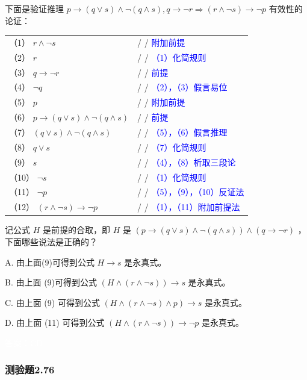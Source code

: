 \documentclass[UTF8, heading=true]{ctexart}
\begin{document}
下面是验证推理 $p \rightarrow(q \vee s) \wedge \neg(q \wedge s), q \rightarrow \neg r \Longrightarrow(r \wedge \neg s) \rightarrow \neg p$ 有效性的论证：
\begin{table}[H]
  \centering
  \renewcommand{\arraystretch}{1.5}
  \begin{tabular}{ll}
    （1）  $r \wedge \neg s$ & / / \textcolor{blue}{附加前提} \\
    （2）  $r$ & / / \textcolor{blue}{（1）化简规则} \\
    （3）  $q \rightarrow \neg r$ & / / \textcolor{blue}{前提} \\
    （4）  $\neg q$ & / / \textcolor{blue}{（2），（3）假言易位} \\
    （5）  $p$ & / / \textcolor{blue}{附加前提} \\
    （6）  $p \rightarrow(q \vee s) \wedge \neg(q \wedge s)$ & / / \textcolor{blue}{前提} \\
    （7）  $(q \vee s) \wedge \neg(q \wedge s)$ & / / \textcolor{blue}{（5），（6）假言推理} \\
    （8）  $q \vee s$ & / / \textcolor{blue}{（7）化简规则} \\
    （9）  $s$ & / / \textcolor{blue}{（4），（8）析取三段论} \\
    （10）  $\neg s$ & / / \textcolor{blue}{（1）化简规则} \\
    （11）  $\neg p$ & / / \textcolor{blue}{（5），（9），（10）反证法} \\
    （12）  $(r \wedge \neg s) \rightarrow \neg p$ & / / \textcolor{blue}{（1），（11）附加前提法} \\
  \end{tabular}
\end{table}

记公式 $H$ 是前提的合取，即 $H$ 是 $(p \rightarrow(q \vee s) \wedge \neg(q \wedge s)) \wedge(q \rightarrow \neg r)$ ，下面哪些说法是正确的？

A. 由上面(9)可得到公式 $H \rightarrow s$ 是永真式。

B. 由上面 (9)可得到公式 $(H \wedge(r \wedge \neg s)) \rightarrow s$ 是永真式。

C. 由上面 (9) 可得到公式 $(H \wedge(r \wedge \neg s) \wedge p) \rightarrow s$ 是永真式。

D.  由上面 (11) 可得到公式 $(H \wedge(r \wedge \neg s)) \rightarrow \neg p$ 是永真式。


\textcolor{white}{答案：CD}



\subsubsection{测验题2.76}
\end{document}
